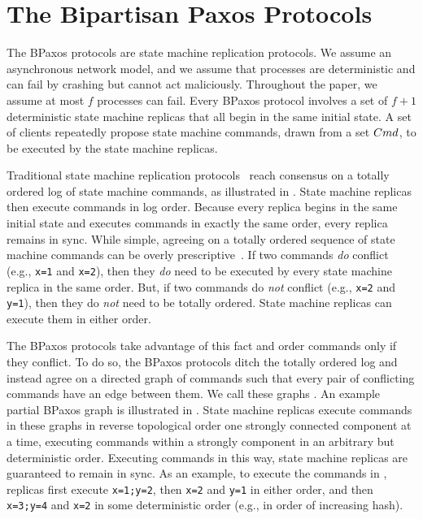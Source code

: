 \section{The Bipartisan Paxos Protocols}
The BPaxos protocols are state machine replication protocols. We assume an
asynchronous network model, and we assume that processes are deterministic and
can fail by crashing but cannot act maliciously. Throughout the paper, we
assume at most $f$ processes can fail. Every BPaxos protocol involves a set of
$f + 1$ deterministic state machine replicas that all begin in the same initial
state. A set of clients repeatedly propose state machine commands, drawn from a
set $Cmd$, to be executed by the state machine replicas.



Traditional state machine replication protocols~\cite{liskov2012viewstamped,
lamport1998part} reach consensus on a totally ordered log of state machine
commands, as illustrated in . State machine replicas then
execute commands in log order. Because every replica begins in the same initial
state and executes commands in exactly the same order, every replica remains in
sync.
%
While simple, agreeing on a totally ordered sequence of state machine commands
can be overly prescriptive~\cite{lamport2005generalized, moraru2013there}. If
two commands \emph{do} conflict (e.g., \texttt{x=1} and \texttt{x=2}), then
they \emph{do} need to be executed by every state machine replica in the same
order.  But, if two commands do \emph{not} conflict (e.g., \texttt{x=2} and
\texttt{y=1}), then they do \emph{not} need to be totally ordered. State
machine replicas can execute them in either order.

The BPaxos protocols take advantage of this fact and order commands only if
they conflict. To do so, the BPaxos protocols ditch the totally ordered log and
instead agree on a directed graph of commands such that every pair of
conflicting commands have an edge between them. We call these graphs
. An example partial BPaxos graph is illustrated
in . State machine replicas execute commands in these graphs
in reverse topological order one strongly connected component at a time,
executing commands within a strongly component in an arbitrary but
deterministic order. Executing commands in this way, state machine replicas are
guaranteed to remain in sync. As an example, to execute the commands in
, replicas first execute \texttt{x=1;y=2}, then \texttt{x=2}
and \texttt{y=1} in either order, and then \texttt{x=3;y=4} and \texttt{x=2} in
some deterministic order (e.g., in order of increasing hash).

